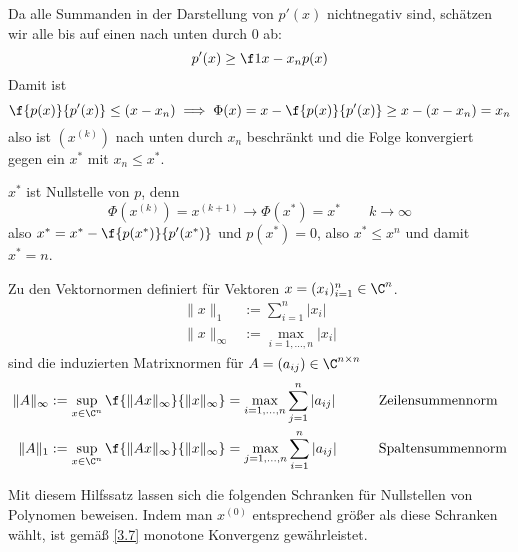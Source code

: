 \documentclass[11pt]{scrbook}
\begin{document}
\begin{st}
\begin{note}
		Da alle Summanden in der Darstellung von $p'(x)$ nichtnegativ sind, schätzen wir alle bis auf einen nach unten durch $0$ ab:
		\[
			p'(x) \ge \f 1{x-x_n}p(x)
		\]
		Damit ist
		\[
			\f {p(x)}{p'(x)} \le (x-x_n)
			\implies
			\Phi(x) = x - \f {p(x)}{p'(x)} \ge x-(x-x_n) = x_n
		\]
		also ist $(x^{(k)})$ nach unten durch $x_n$ beschränkt und die Folge konvergiert gegen ein $x^*$ mit $x_n \le x^*$.

		$x^*$ ist Nullstelle von $p$, denn
		\[
			\Phi(x^{(k)}) = x^{(k+1)}
			\to
			\Phi(x^*) = x^*
			\qquad k\to\infty
		\]
		also $x^* = x^* - \f {p(x^*)}{p'(x^*)}$ und $p(x^*) = 0$, also $x^* \le x^n$ und damit $x^*=n$.
	\end{note}
\end{st}

\begin{st} \label{3.8}
	Zu den Vektornormen definiert für Vektoren $x=(x_i)_{i=1}^n \in \C^n$.
	\begin{align*}
		\|x\|_1 &:= \sum_{i=1}^n |x_i| \\
		\|x\|_\infty &:= \max_{i = 1,\dotsc,n} |x_i|
	\end{align*}
	sind die induzierten Matrixnormen für $A=(a_{ij}) \in \C^{n\times n}$
	\begin{alignat*}{3}
		\|A\|_\infty &:= \sup_{x\in \C^n} \f{\|Ax\|_\infty}{\|x\|_\infty} = \max_{i=1,\dotsc,n} \sum_{j=1}^n |a_{ij}| &
			& \qquad\text{Zeilensummennorm} \\
		\|A\|_1 &:= \sup_{x\in \C^n} \f{\|Ax\|_\infty}{\|x\|_\infty} = \max_{j=1,\dotsc,n} \sum_{i=1}^n |a_{ij}| &
			& \qquad\text{Spaltensummennorm}
	\end{alignat*}
\end{st}

Mit diesem Hilfssatz lassen sich die folgenden Schranken für Nullstellen von Polynomen beweisen.
Indem man $x^{(0)}$ entsprechend größer als diese Schranken wählt, ist gemäß \ref{3.7} monotone Konvergenz gewährleistet.
\end{document}
